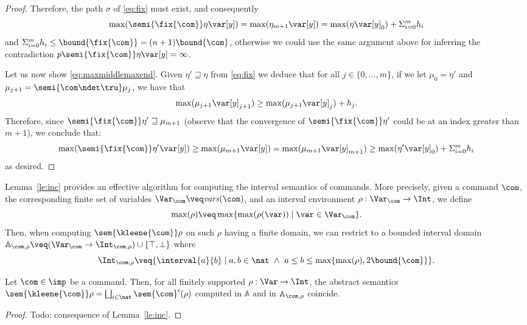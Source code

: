 \begin{proof}
  \noindent
  Therefore, the path \(\sigma\) of \eqref{eq:fix} must exist, and consequently
  \[\max(\semi{\fix{\com}} \eta \var[y]) = \max(\eta_{m+1} \var[y]) = \max(\eta  \var[y]_0) + \Sigma_{i=0}^m h_i\]
  and
  \(\Sigma_{i=0}^m h_i \leq \bound{\fix{\com}}=(n+1)\bound{\com}\),
  otherwise we could use the same argument above for inferring the
  contradiction \(p\semi{\fix{\com}} \eta \var[y] = \infty\).

  \medskip

  Let us now show \eqref{eq:maxmiddlemaxend}. Given
  \(\eta' \sqsupseteq \eta\) from \eqref{eq:fix} we deduce that for
  all \(j \in \{ 0, \ldots, m\}\), if we let \(\mu_0 = \eta'\) and
  \(\mu_{j+1} = \semi{\com \ndet \tru} \mu_j\), we have that
  \[
  \max(\mu_{j+1} \var[y]_{j+1}) \geq \max(\mu_{j+1} \var[y]_{j}) + h_j.
  \]
  Therefore, since \(\semi{\fix{\com}} \eta' \sqsupseteq \mu_{m+1}\)
  (observe that the convergence of \(\semi{\fix{\com}} \eta' \) could
  be at an index greater than \(m+1\)), we conclude that:
  \[\max(\semi{\fix{\com}} \eta' \var[y]) \geq \max(\mu_{m+1}
  \var[y]) = \max(\mu_{m+1} \var[y]_{m+1}) \geq \max(\eta' \var[y]_0)
  + \Sigma_{i=0}^m h_i\] as desired.
\end{proof}

Lemma~\ref{le:inc} provides an effective algorithm for computing the
interval semantics of commands. More precisely, given a command
\(\com\), the corresponding finite set of variables
\(\Var_{\com} \veq \mathit{vars}(\com)\), and an interval environment
\(\rho : \Var_{\com} \to \Int\), we define
\[\max(\rho) \veq \max \{ \max(\rho(\var)) \mid \var \in \Var_{\com}
  \}.\]
%
Then, when computing \(\sem{\kleene{\com}} \rho\) on such \(\rho\)
having a finite domain, we can restrict to a bounded interval domain
\(\mathbb{A}_{\com,\rho} \veq (\Var_{\com} \to \Int_{\com,\rho}) \cup
\{ \top, \bot \}\) where
\[
  \Int_{\com,\rho} \veq \{ \interval{a}{b} \mid a, b \in \nat\ \land\
  a \leq b \leq \max\{\max(\rho), 2 \bound{\com}\}\}.
\]


\begin{lemma}
  Let \(\com\in \imp\) be a command. Then, for all finitely supported
  \(\rho : \Var \to \Int\), the abstract semantics
  \(\sem{\kleene{\com}} \rho = \textstyle \bigsqcup_{i \in \nat}
  \sem{\com}^i (\rho)\)
  computed in \(\mathbb{A}\) and in \(\mathbb{A}_{\com,\rho}\)
  coincide.
\end{lemma}

\begin{proof}
  Todo: consequence of Lemma~\ref{le:inc}.
\end{proof}
